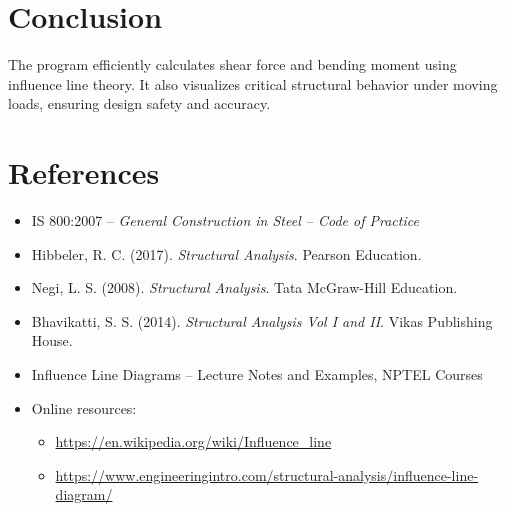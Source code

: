 \documentclass[12pt,a4paper]{article}
\begin{document}
\section*{Conclusion}
The program efficiently calculates shear force and bending moment using influence line theory. It also visualizes critical structural behavior under moving loads, ensuring design safety and accuracy.

\section{References}

\begin{itemize}
    \item IS 800:2007 – \textit{General Construction in Steel – Code of Practice}
    \item Hibbeler, R. C. (2017). \textit{Structural Analysis}. Pearson Education.
    \item Negi, L. S. (2008). \textit{Structural Analysis}. Tata McGraw-Hill Education.
    \item Bhavikatti, S. S. (2014). \textit{Structural Analysis Vol I and II}. Vikas Publishing House.
    \item Influence Line Diagrams – Lecture Notes and Examples, NPTEL Courses
    \item Online resources: 
    \begin{itemize}
        \item \url{https://en.wikipedia.org/wiki/Influence_line}
        \item \url{https://www.engineeringintro.com/structural-analysis/influence-line-diagram/}
    \end{itemize}
\end{itemize}
\end{document}
